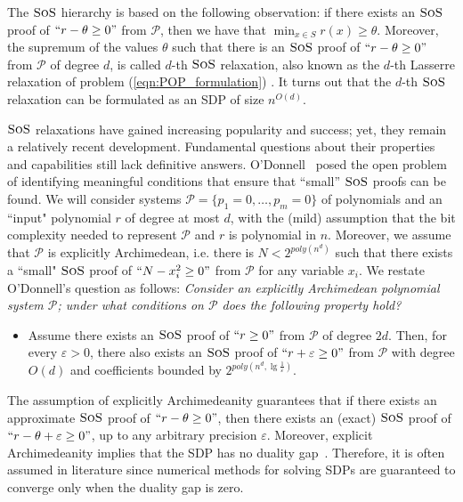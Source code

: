 \documentclass[11pt]{article}
\newcommand{\sos}{\text{\sc{SoS}}}
\newcommand{\1}{\textbf{1}}
\begin{document}
The $\sos$ hierarchy is based on the following observation: if there exists an $\sos$ proof of $`` r - \theta \geq 0"$ from $\mathcal{P}$, then we have that $\min_{x \in S} r(x) \geq \theta$. Moreover, the supremum of the values $\theta$ such that there is an $\sos$ proof of $``r - \theta \geq 0"$ from $\mathcal{P}$ of degree $d$, is called $d$-th $\sos$ relaxation, also known as the $d$-th Lasserre relaxation of problem (\ref{eqn:POP_formulation}) \cite{Lasserre2001,Parrilo03}. It turns out that the $d$-th  $\sos$ relaxation can be formulated as an SDP of size $n^{O(d)}$.

\(\sos\) relaxations have gained increasing popularity and success; yet, they remain a relatively recent development. Fundamental questions about their properties and capabilities still lack definitive answers. %
O'Donnell~\cite{odonnell2017} posed the open problem of identifying meaningful conditions that ensure that “small” \(\sos\) proofs can be found. We will consider systems $\mathcal{P} = \{p_1 = 0,\ldots,p_m = 0\}$ of polynomials and an ``input" polynomial $r$ of degree at most $d$, with the (mild) assumption that the bit complexity needed to represent $\mathcal{P}$ and $r$ is polynomial in $n$. Moreover, we assume that $\mathcal{P}$ is explicitly Archimedean, i.e. there is $N<2^{poly(n^d)}$ such that there exists a ``small" $\sos$ proof of $``N - x_i^2 \geq 0"$ from $\mathcal{P}$ for any variable $x_i$.
We restate O'Donnell's question as follows: \emph{Consider an explicitly Archimedean polynomial system \(\mathcal{P}\); under what conditions on $\mathcal{P}$ does the following property hold?}
%
\begin{itemize}[label=$(\rm{P})$]
    \item Assume there exists an $\sos$ proof of $``r \geq 0"$ from $\mathcal{P}$ of degree $2d$. Then, for every $\varepsilon>0$, there also exists an $\sos$ proof of $``r +\varepsilon \geq 0"$ from $\mathcal{P}$ with degree $O(d)$ and coefficients bounded by $2^{poly(n^d,\lg \frac{1}{\varepsilon})}$.
\end{itemize}

The assumption of explicitly Archimedeanity guarantees that if there exists an approximate $\sos$ proof of $``r - \theta \geq 0"$, then there exists an (exact) $\sos$ proof of $``r - \theta + \varepsilon \geq 0"$, up to any arbitrary precision $\varepsilon$.
Moreover, explicit Archimedeanity implies that the SDP has no duality gap~\cite{JoszH16}. Therefore, it is often assumed in literature since numerical methods for solving SDPs are guaranteed to converge only when the duality gap is zero.
\end{document}
